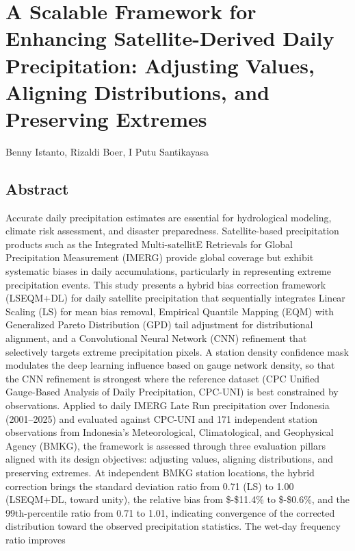 \documentclass[
]{article}
\author{}
\date{}
\begin{document}
\section{A Scalable Framework for Enhancing Satellite-Derived Daily
Precipitation: Adjusting Values, Aligning Distributions, and Preserving
Extremes}\label{a-scalable-framework-for-enhancing-satellite-derived-daily-precipitation-adjusting-values-aligning-distributions-and-preserving-extremes}

Benny Istanto, Rizaldi Boer, I Putu Santikayasa

\subsection{Abstract}\label{abstract}

Accurate daily precipitation estimates are essential for hydrological
modeling, climate risk assessment, and disaster preparedness.
Satellite-based precipitation products such as the Integrated
Multi-satellitE Retrievals for Global Precipitation Measurement (IMERG)
provide global coverage but exhibit systematic biases in daily
accumulations, particularly in representing extreme precipitation
events. This study presents a hybrid bias correction framework
(LSEQM+DL) for daily satellite precipitation that sequentially
integrates Linear Scaling (LS) for mean bias removal, Empirical Quantile
Mapping (EQM) with Generalized Pareto Distribution (GPD) tail adjustment
for distributional alignment, and a Convolutional Neural Network (CNN)
refinement that selectively targets extreme precipitation pixels. A
station density confidence mask modulates the deep learning influence
based on gauge network density, so that the CNN refinement is strongest
where the reference dataset (CPC Unified Gauge-Based Analysis of Daily
Precipitation, CPC-UNI) is best constrained by observations. Applied to
daily IMERG Late Run precipitation over Indonesia (2001--2025) and
evaluated against CPC-UNI and 171 independent station observations from
Indonesia's Meteorological, Climatological, and Geophysical Agency
(BMKG), the framework is assessed through three evaluation pillars
aligned with its design objectives: adjusting values, aligning
distributions, and preserving extremes. At independent BMKG station
locations, the hybrid correction brings the standard deviation ratio
from 0.71 (LS) to 1.00 (LSEQM+DL, toward unity), the relative bias from
\$-\$11.4\% to \$-\$0.6\%, and the 99th-percentile ratio from 0.71 to
1.01, indicating convergence of the corrected distribution toward the
observed precipitation statistics. The wet-day frequency ratio improves
\end{document}
